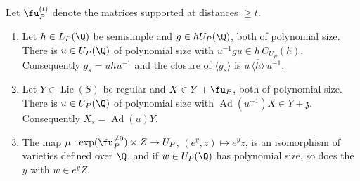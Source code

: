 \begin{lemma}\label{lem:iter}
Let $\fu_P^{(t)}$ denote the matrices supported at distances $\ge t$.
\begin{enumerate}
\item Let $h\in L_P(\Q)$ be semisimple and $g\in hU_P(\Q)$, both of polynomial size. There is
$u\in U_P(\Q)$ of polynomial size with $u^{-1}gu\in h\,C_{U_P}(h)$. Consequently $g_s=uhu^{-1}$ and the
closure of $\langle g_s\rangle$ is $u\,\overline{\langle h\rangle}\,u^{-1}$.
\item Let $Y\in\operatorname{Lie}(S)$ be regular and $X\in Y+\fu_P$, both of polynomial size. There is
$u\in U_P(\Q)$ of polynomial size with $\operatorname{Ad}(u^{-1})X\in Y+\mathfrak z$. Consequently
$X_s=\operatorname{Ad}(u)Y$.
\item The map $\mu:\exp(\fu_P^{\ne0})\times Z\to U_P$, $(e^y,z)\mapsto e^yz$, is an isomorphism of
varieties defined over $\Q$, and if $w\in U_P(\Q)$ has polynomial size, so does the $y$ with
$w\in e^yZ$.
\end{enumerate}
\end{lemma}
